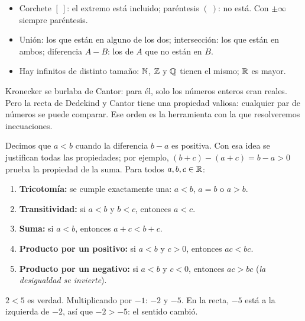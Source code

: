 \documentclass[11pt]{article}
\begin{document}
\begin{resumen}
\begin{itemize}
  \item Corchete $[\ ]$: el extremo está incluido; paréntesis $(\ )$: no está.
        Con $\pm\infty$ siempre paréntesis.
  \item Unión: los que están en alguno de los dos; intersección: los que están en
        ambos; diferencia $A - B$: los de $A$ que no están en $B$.
  \item Hay infinitos de distinto tamaño: $\mathbb{N}$, $\mathbb{Z}$ y $\mathbb{Q}$ tienen el mismo; $\mathbb{R}$ es mayor.
\end{itemize}
\end{resumen}

\label{tema:orden}

\begin{hilo}
Kronecker se burlaba de Cantor: para él, solo los números enteros eran reales.
Pero la recta de Dedekind y Cantor tiene una propiedad valiosa: cualquier par de
números se puede comparar. Ese orden es la herramienta con la que resolveremos
inecuaciones.
\end{hilo}

\begin{definicion}
Decimos que $a < b$ cuando la diferencia $b - a$ es positiva. Con esa idea se
justifican todas las propiedades; por ejemplo, $(b + c) - (a + c) = b - a > 0$
prueba la propiedad de la suma. Para todos $a, b, c \in \mathbb{R}$:
\begin{enumerate}[label=\arabic*.]
  \item \textbf{Tricotomía:} se cumple exactamente una: $a < b$, $a = b$ o $a > b$.
  \item \textbf{Transitividad:} si $a < b$ y $b < c$, entonces $a < c$.
  \item \textbf{Suma:} si $a < b$, entonces $a + c < b + c$.
  \item \textbf{Producto por un positivo:} si $a < b$ y $c > 0$, entonces $ac < bc$.
  \item \textbf{Producto por un negativo:} si $a < b$ y $c < 0$, entonces
        $ac > bc$ (\emph{la desigualdad se invierte}).
\end{enumerate}
\end{definicion}

\begin{ejemplo}
$2 < 5$ es verdad. Multiplicando por $-1$: $-2$ y $-5$. En la recta, $-5$ está a la
izquierda de $-2$, así que $-2 > -5$: el sentido cambió.
\end{ejemplo}
\end{document}
